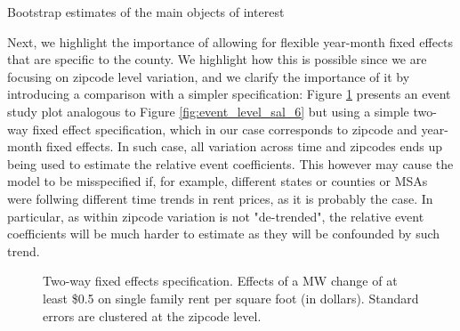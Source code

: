 \begin{table}[h!]
    \centering
    \caption{Bootstrap estimates of the main objects of interest}
    \resizebox{\textwidth}{!}{
    
    }
    \label{tab:bootstrap_table}
\end{table}


Next, we highlight the importance of allowing for flexible year-month fixed effects that are specific to the county. We highlight how this is possible since we are focusing on zipcode level variation, and we clarify the importance of it by introducing a comparison with a simpler specification: Figure \ref{fig:event_level_2way} presents an event study plot analogous to Figure \ref{fig:event_level_sal_6} but using a simple two-way fixed effect specification, which in our case corresponds to zipcode and year-month fixed effects. In such case, all variation across time and zipcodes ends up being used to estimate the relative event coefficients. This however may cause the model to be misspecified if, for example, different states or counties or MSAs were follwing different time trends in rent prices, as it is probably the case. In particular, as within zipcode variation is not "de-trended", the relative event coefficients will be much harder to estimate as they will be confounded by such trend. \\

\begin{figure}[h!]
    \centering
    \caption{Two-way fixed effects specification. Effects of a MW change of at least \$0.5 on single family rent per square foot (in dollars). Standard errors are clustered at the zipcode level.}
    \label{fig:event_level_2way}
\end{figure}

